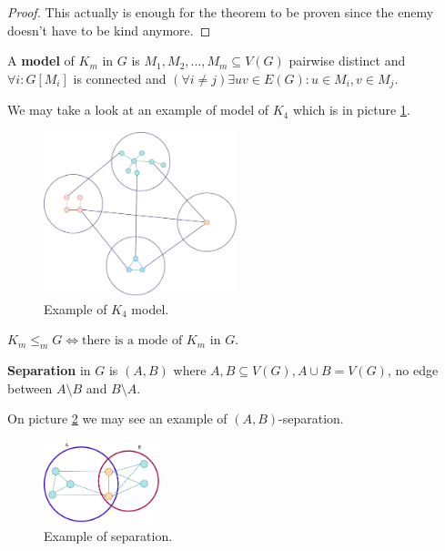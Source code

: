 \begin{proof}
	This actually is enough for the theorem to be proven since the enemy doesn't have to be kind anymore.
\end{proof}

\begin{defn}
	A \textbf{model} of $K_{m}$ in $G$ is $M_{1}, M_{2}, \dots, M_{m} \subseteq V(G)$ pairwise distinct and $\forall i : G[M_{i}]$ is connected and $(\forall i \neq j) \exists uv \in E(G): u \in M_{i}, v\in M_{j}$.
\end{defn}

We may take a look at an example of model of $K_{4}$ which is in picture \ref{k4-model}.

\begin{figure}[!ht]\centering
	\includegraphics[width=0.5\textwidth]{res/km-model.pdf}
	\caption{Example of $K_{4}$ model.}
	\label{k4-model}
\end{figure}

\begin{observ}
	$K_{m} \leq_{m} G \Leftrightarrow \text{there is a mode of } K_{m} \text{ in } G$.
\end{observ}

\begin{defn}
	\textbf{Separation} in $G$ is $(A,B)$ where $A,B \subseteq V(G), A \cup B = V(G)$, no edge between $A \setminus B$ and $B \setminus A$.
\end{defn}

On picture \ref{separation} we may see an example of $(A,B)$-separation.

\begin{figure}[!ht]\centering
	\includegraphics[width=0.3\textwidth]{res/separation.pdf}
	\caption{Example of separation.}
	\label{separation}
\end{figure}

